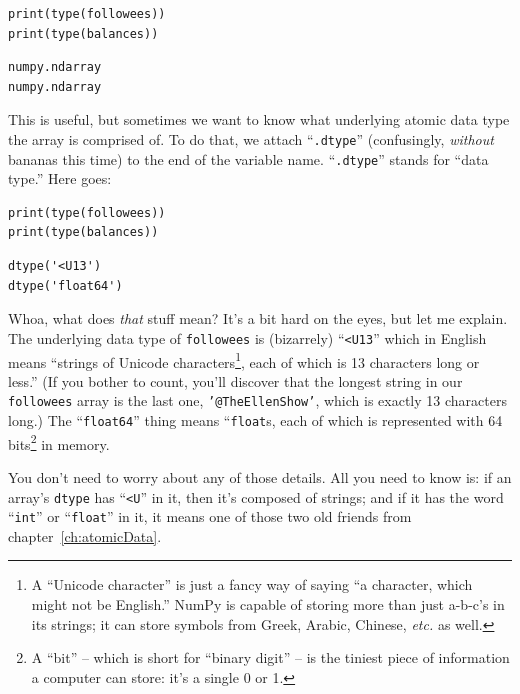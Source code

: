 \begin{Verbatim}[fontsize=\small,samepage=true,frame=single,framesep=3mm]
print(type(followees))
print(type(balances))
\end{Verbatim}

\begin{Verbatim}[fontsize=\small,samepage=true,frame=leftline,framesep=5mm,framerule=1mm]
numpy.ndarray
numpy.ndarray
\end{Verbatim}

This is useful, but sometimes we want to know what underlying atomic data type
the array is comprised of. To do that, we attach ``\texttt{.dtype}''
(confusingly, \textit{without} bananas this time) to the end of the variable
name. ``\texttt{.dtype}'' stands for ``data type.'' Here goes:

\begin{Verbatim}[fontsize=\small,samepage=true,frame=single,framesep=3mm]
print(type(followees))
print(type(balances))
\end{Verbatim}

\begin{Verbatim}[fontsize=\small,samepage=true,frame=leftline,framesep=5mm,framerule=1mm]
dtype('<U13')
dtype('float64')
\end{Verbatim}

Whoa, what does \textit{that} stuff mean? It's a bit hard on the eyes, but let
me explain. The underlying data type of \texttt{followees} is (bizarrely)
``\texttt{<U13}'' which in English means ``strings of Unicode
characters\footnote{A ``Unicode character'' is just a fancy way of saying ``a
character, which might not be English.'' NumPy is capable of storing more than
just a-b-c's in its strings; it can store symbols from Greek, Arabic, Chinese,
\textit{etc.} as well.}, each of which is 13 characters long or less.'' (If you
bother to count, you'll discover that the longest string in our
\texttt{followees} array is the last one, \texttt{'@TheEllenShow'}, which is
exactly 13 characters long.) The ``\texttt{float64}'' thing means
``\texttt{float}s, each of which is represented with 64 bits\footnote{A ``bit''
-- which is short for ``binary digit'' -- is the tiniest piece of information a
computer can store: it's a single 0 or 1.} in memory.

You don't need to worry about any of those details. All you need to know is: if
an array's \texttt{dtype} has ``\texttt{<U}'' in it, then it's composed of
strings; and if it has the word ``\texttt{int}'' or ``\texttt{float}'' in it,
it means one of those two old friends from chapter~\ref{ch:atomicData}.

